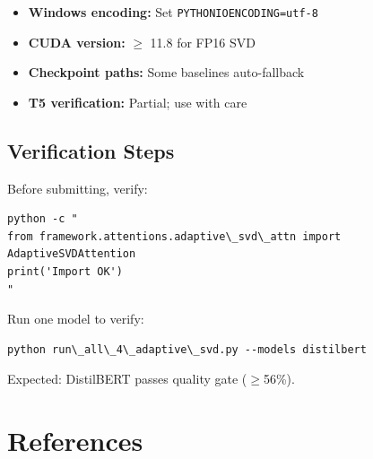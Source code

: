 \begin{itemize}
\item \textbf{Windows encoding:} Set \texttt{PYTHONIOENCODING=utf-8}
\item \textbf{CUDA version:} $\ge$ 11.8 for FP16 SVD
\item \textbf{Checkpoint paths:} Some baselines auto-fallback
\item \textbf{T5 verification:} Partial; use with care

\end{itemize}
\subsection{Verification Steps}

Before submitting, verify:

\begin{lstlisting}
python -c "
from framework.attentions.adaptive\_svd\_attn import AdaptiveSVDAttention
print('Import OK')
"
\end{lstlisting}

Run one model to verify:

\begin{lstlisting}
python run\_all\_4\_adaptive\_svd.py --models distilbert
\end{lstlisting}

Expected: DistilBERT passes quality gate ($\ge$56\%).


\section{References}

